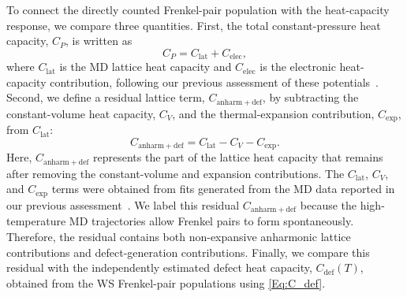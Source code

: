\documentclass[preprint,12pt,sort&compress]{elsarticle}
\newcommand{\?}{\stackrel{?}{=}}
\begin{document}


To connect the directly counted Frenkel-pair population with the heat-capacity response, we compare three quantities. First, the total constant-pressure heat capacity, $C_P$, is written as
\begin{equation}
C_P = C_{\mathrm{lat}} + C_{\mathrm{elec}},
\end{equation}
where $C_{\mathrm{lat}}$ is the MD lattice heat capacity and $C_{\mathrm{elec}}$ is the electronic heat-capacity contribution, following our previous assessment of these potentials~\cite{AbdulHameed2024}. Second, we define a residual lattice term, $C_{\mathrm{anharm+def}}$, by subtracting the constant-volume heat capacity, $C_V$, and the thermal-expansion contribution, $C_{\mathrm{exp}}$, from $C_{\mathrm{lat}}$:
\begin{equation}
C_{\mathrm{anharm+def}} = C_{\mathrm{lat}} - C_V - C_{\mathrm{exp}}.
\label{Eq:C_anharm_def}
\end{equation}
Here, $C_{\mathrm{anharm+def}}$ represents the part of the lattice heat capacity that remains after removing the constant-volume and expansion contributions. The $C_{\mathrm{lat}}$, $C_V$, and $C_{\mathrm{exp}}$ terms were obtained from fits generated from the MD data reported in our previous assessment~\cite{AbdulHameed2024}. We label this residual $C_{\mathrm{anharm+def}}$ because the high-temperature MD trajectories allow Frenkel pairs to form spontaneously. Therefore, the residual contains both non-expansive anharmonic lattice contributions and defect-generation contributions. Finally, we compare this residual with the independently estimated defect heat capacity, $C_{\mathrm{def}}(T)$, obtained from the WS Frenkel-pair populations using \cref{Eq:C_def}.
\end{document}
